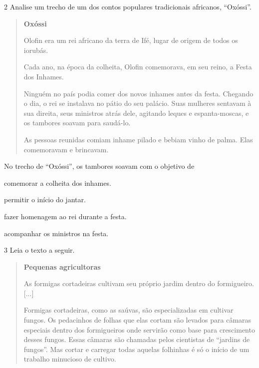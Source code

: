 \num{2} Analise um trecho de um dos contos populares tradicionais africanos, ``Oxóssi''.

\begin{quote}
\textbf{Oxóssi}

Olofin era um rei africano da terra de Ifé, lugar de origem de todos os
iorubás.

Cada ano, na época da colheita, Olofin comemorava, em seu reino, a Festa
dos Inhames.

Ninguém no país podia comer dos novos inhames antes da festa. Chegando o
dia, o rei se instalava no pátio do seu palácio. Suas mulheres sentavam 
à sua direita, seus ministros atrás dele, agitando leques e 
espanta-moscas, e os tambores soavam para saudá-lo.

As pessoas reunidas comiam inhame pilado e bebiam vinho de palma. Elas
comemoravam e brincavam.


\end{quote}

\pagebreak
No trecho de ``Oxóssi'', os tambores soavam com o objetivo de

\begin{escolha}
\item comemorar a colheita dos inhames.

\item permitir o início do jantar.

\item fazer homenagem ao rei durante a festa.

\item acompanhar os ministros na festa.
\end{escolha}

\num{3} Leia o texto a seguir. %

\begin{quote}
\textbf{Pequenas agricultoras}

As formigas cortadeiras cultivam seu próprio jardim dentro do
formigueiro. {[}...{]}

Formigas cortadeiras, como as saúvas, são especializadas em cultivar
fungos. Os pedacinhos de folhas que elas cortam são levados para câmaras
especiais dentro dos formigueiros onde servirão como base para crescimento
desses fungos. Essas câmaras são chamadas pelos cientistas de ``jardins de
fungos''. Mas cortar e carregar todas aquelas folhinhas é só o início de um
trabalho minucioso de cultivo.

\end{quote}

